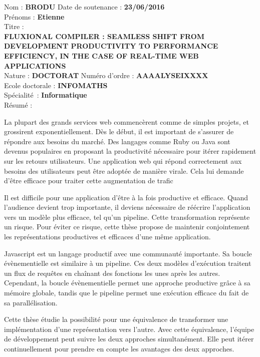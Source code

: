 \begin{framed}
\noindent %
Nom : \textbf{\MakeUppercase{Brodu}} \hfill Date de soutenance : \textbf{23/06/2016}\\[3pt]
Prénoms : \textbf{Etienne}\\[3pt]
Titre :\\
\textbf{\MakeUppercase{Fluxional compiler : seamless shift from development productivity to performance efficiency, in the case of real-time web applications}}
\\

\noindent %
Nature : \textbf{\MakeUppercase{Doctorat}} \hfill Numéro d'ordre :  \textbf{AAAALYSEIXXXX}\\[3pt]
Ecole doctorale : \textbf{INFOMATHS}\\[3pt]
Spécialité : \textbf{Informatique}\\[3pt]
Résumé : \\
{\fontsize{11pt}{12pt}\selectfont%
La plupart des grands services web commencèrent comme de simples projets, et grossirent exponentiellement.
Dès le début, il est important de s'assurer de répondre aux besoins du marché.
Des langages comme Ruby ou Java sont devenus populaires en proposant la productivité  nécessaire pour itérer rapidement sur les retours utilisateurs.
Une application web qui répond correctement aux besoins des utilisateurs peut être adoptée de manière virale.
Cela lui demande d'être efficace pour traiter cette augmentation de trafic

Il est difficile pour une application d'être à la fois productive et efficace.
Quand l'audience devient trop importante, il deviens nécessaire de réécrire l'application vers un modèle plus efficace, tel qu'un pipeline.
Cette transformation représente un risque.
Pour éviter ce risque, cette thèse propose de maintenir conjointement les représentations productives et efficaces d'une même application.

Javascript est un langage productif avec une communauté importante.
Sa boucle évènementielle est similaire à un pipeline.
Ces deux modèles d’exécution traitent un flux de requêtes en chaînant des fonctions les unes après les autres.
Cependant, la boucle évènementielle permet une approche productive grâce à sa mémoire globale, tandis que le pipeline permet une exécution efficace du fait de sa parallélisation.

Cette thèse étudie la possibilité pour une équivalence de transformer une implémentation d'une représentation vers l'autre.
Avec cette équivalence, l'équipe de développement peut suivre les deux approches simultanément.
Elle peut itérer continuellement pour prendre en compte les avantages des deux approches.

}
\end{framed}
